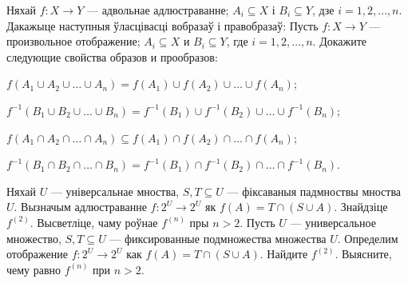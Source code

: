 




\begin{problemList}

\problemItemWithCommonPart
{Няхай $f \colon X \to Y$ --- адвольнае адлюстраванне;
$A_i \subseteq X$ і $B_i \subseteq Y$, дзе $i = 1, 2, \ldots, n$. 
Дакажыце наступныя ўласцівасці вобразаў і правобразаў:}
{Пусть $f \colon X \to Y$ --- произвольное отображение; 
$A_i \subseteq X$ и $B_i \subseteq Y$, где $i = 1, 2, \ldots, n$.
Докажите следующие свойства образов и прообразов:}
{%
\begin{belarusianEnumerate}
	
\item $f(A_1 \cup A_2 \cup \ldots \cup A_n) = f(A_1) \cup f(A_2) \cup \ldots \cup f(A_n)$;

\item $f^{-1}(B_1 \cup B_2 \cup \ldots \cup B_n) = f^{-1}(B_1) \cup f^{-1}(B_2) \cup \ldots \cup f^{-1}(B_n)$;

\item $f(A_1 \cap A_2 \cap \ldots \cap A_n) \subseteq f(A_1) \cap f(A_2) \cap \ldots \cap f(A_n)$;

\item $f^{-1}(B_1 \cap B_2 \cap \ldots \cap B_n) = f^{-1}(B_1) \cap f^{-1}(B_2) \cap \ldots \cap f^{-1}(B_n)$.
	
\end{belarusianEnumerate}
}

\bigskip

\problemItemSimple
{Няхай $U$ --- універсальнае мноства, $S, T \subseteq U$ --- фіксаваныя падмноствы мноства $U$. Вызначым адлюстраванне $f \colon 2^U \to 2^U$ як $f(A) = T \cap (S \cup A)$. Знайдзіце $f^{(2)}$. Высветліце, чаму роўнае $f^{(n)}$ пры $n > 2$.}
{Пусть $U$ --- универсальное множество, $S, T \subseteq U$ --- фиксированные подмножества множества $U$. Определим отображение $f \colon 2^U \to 2^U$ как $f(A) = T \cap (S \cup A)$. Найдите $f^{(2)}$. Выясните, чему равно $f^{(n)}$ при $n > 2$.}

\bigskip


\end{problemList}
